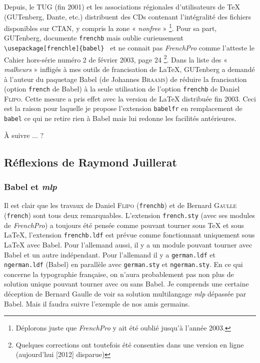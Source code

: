 \documentclass[a4paper,12pt,openright]{article}
\begin{document}
Depuis, le TUG (fin 2001) et les associations régionales d’utilisateurs de
\TeX{} (GUTenberg, Dante, etc.) distribuent des CDs contenant l’intégralité des
fichiers disponibles sur CTAN, y compris la zone « \textit{nonfree} » %
\footnote{ Déplorons juste que \textsl{FrenchPro} y ait été oublié jusqu’à l’année 2003.}. 
Pour sa part, GUTenberg, documente \texttt{frenchb} 
 mais oublie curieusement
\texttt{{\backslash}usepackage[frenchle]\{babel\} }
et ne connait pas \textsl{FrenchPro} comme l’atteste
le Cahier hors-série numéro 2 de février 2003, page 24%
\footnote{Quelques corrections ont toutefois été consenties dans une version en ligne
(aujourd'hui [2012] disparue) }.
Dans la liste des « \textit{malheurs} » infligés à mes outils de francisation de \LaTeX,
GUTenberg a demandé à l’auteur du paquetage Babel (de Johannes \textsc{Braams})
de réduire la francisation (option \texttt{french} de Babel) à la seule utilisation de
l’option \texttt{frenchb} de Daniel \textsc{Flipo}. 
Cette mesure a pris effet avec la version
de \LaTeX{} distribuée fin 2003. Ceci est la raison pour laquelle je propose l’extension
\texttt{babelfr} en remplacement 
de \texttt{babel} ce qui ne retire rien à Babel mais lui
redonne les facilités antérieures.

À suivre ... ?

\subsection{Réflexions de Raymond Juillerat}
\subsubsection{Babel et \textsl{mlp}}\label{refmlp}
Il est clair que les travaux de Daniel \textsc{Flipo} (\texttt{frenchb})
    et de Bernard \textsc{Gaulle} (\texttt{french})
sont tous deux remarquables. L'extension \texttt{french.sty} 
(avec ses modules de \textsl{FrenchPro})
a toujours été pensée comme
pouvant tourner sous \TeX{} et sous \LaTeX, l'extension \texttt{frenchb.ldf} est prévue comme
fonctionnant uniquement sous \LaTeX{} avec 
Babel.
\MAJ Pour l'allemand aussi, il y a un module pouvant tourner avec Babel  et
un autre indépendant. 
Pour l'allemand il y a \texttt{german.ldf} et \texttt{ngerman.ldf} ({Babel}) 
en parallèle avec \texttt{german.sty} et  \texttt{ngerman.sty}.  
En ce qui concerne la typographie française, on n'aura 
probablement pas non plus de solution unique pouvant tourner avec ou sans Babel. \endMAJ Je comprends une certaine 
déception de Bernard Gaulle de voir sa solution multilangage \textsl{mlp} dépassée par Babel.
Mais il faudra suivre l'exemple de nos amis germains.
\end{document}
